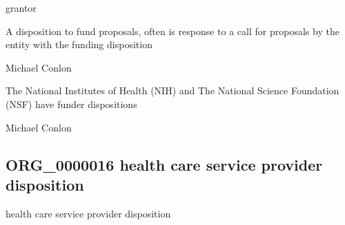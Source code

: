 \documentclass[letterpaper,10pt,english]{sphinxmanual}
\begin{document}
\begin{sphinxShadowBox}

\sphinxAtStartPar
grantor
\end{sphinxShadowBox}

\begin{sphinxShadowBox}

\sphinxAtStartPar
A disposition to fund proposals, often is response to a call for proposals by the entity with the funding disposition
\end{sphinxShadowBox}

\begin{sphinxShadowBox}

\sphinxAtStartPar
Michael Conlon 
\end{sphinxShadowBox}

\begin{sphinxShadowBox}

\sphinxAtStartPar
The National Institutes of Health (NIH) and The National Science Foundation (NSF) have funder dispositions
\end{sphinxShadowBox}

\begin{sphinxShadowBox}

\sphinxAtStartPar
Michael Conlon 
\end{sphinxShadowBox}
\begin{quote}

\ignorespaces \end{quote}


\subsection{ORG\_0000016 \sphinxhyphen{} health care service provider disposition}
\label{\detokenize{doc-ORG_0000016:org-0000016-health-care-service-provider-disposition}}\label{\detokenize{doc-ORG_0000016:index-0}}\label{\detokenize{doc-ORG_0000016::doc}}
\begin{sphinxShadowBox}

\sphinxAtStartPar
health care service provider disposition
\end{sphinxShadowBox}
\end{document}
